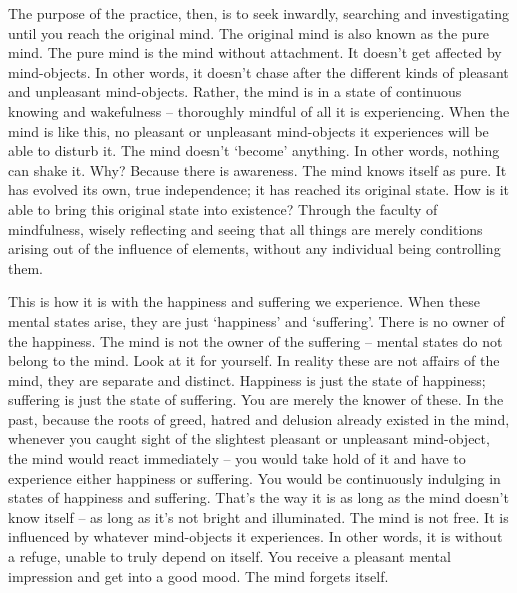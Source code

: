 The purpose of the practice, then, is to seek inwardly, searching and investigating until you reach the original mind. The original mind is also known as the pure mind. The pure mind is the mind without attachment. It doesn't get affected by mind-objects. In other words, it doesn't chase after the different kinds of pleasant and unpleasant mind-objects. Rather, the mind is in a state of continuous knowing and wakefulness -- thoroughly mindful of all it is experiencing. When the mind is like this, no pleasant or unpleasant mind-objects it experiences will be able to disturb it. The mind doesn't `become' anything. In other words, nothing can shake it. Why? Because there is awareness. The mind knows itself as pure. It has evolved its own, true independence; it has reached its original state. How is it able to bring this original state into existence? Through the faculty of mindfulness, wisely reflecting and seeing that all things are merely conditions arising out of the influence of elements, without any individual being controlling them.

This is how it is with the happiness and suffering we experience. When these mental states arise, they are just `happiness' and `suffering'. There is no owner of the happiness. The mind is not the owner of the suffering -- mental states do not belong to the mind. Look at it for yourself. In reality these are not affairs of the mind, they are separate and distinct. Happiness is just the state of happiness; suffering is just the state of suffering. You are merely the knower of these. In the past, because the roots of greed, hatred and delusion already existed in the mind, whenever you caught sight of the slightest pleasant or unpleasant mind-object, the mind would react immediately -- you would take hold of it and have to experience either happiness or suffering. You would be continuously indulging in states of happiness and suffering. That's the way it is as long as the mind doesn't know itself -- as long as it's not bright and illuminated. The mind is not free. It is influenced by whatever mind-objects it experiences. In other words, it is without a refuge, unable to truly depend on itself. You receive a pleasant mental impression and get into a good mood. The mind forgets itself.

